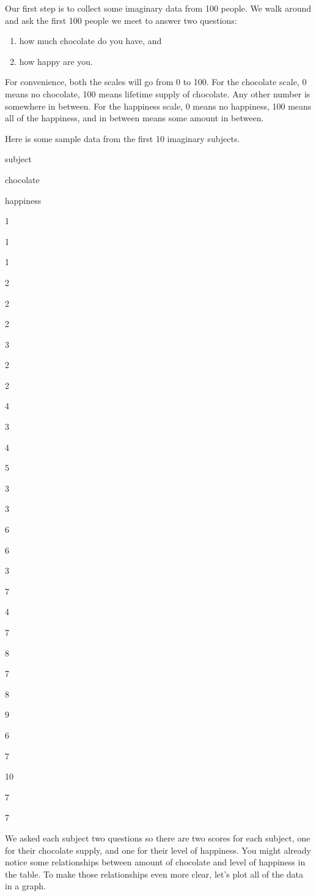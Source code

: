\documentclass[]{book}
\providecommand{\tightlist}{%
  \setlength{\itemsep}{0pt}\setlength{\parskip}{0pt}}
\begin{document}
Our first step is to collect some imaginary data from 100 people. We walk around and ask the first 100 people we meet to answer two questions:

\begin{enumerate}
\def\labelenumi{\arabic{enumi}.}
\tightlist
\item
  how much chocolate do you have, and
\item
  how happy are you.
\end{enumerate}

For convenience, both the scales will go from 0 to 100. For the chocolate scale, 0 means no chocolate, 100 means lifetime supply of chocolate. Any other number is somewhere in between. For the happiness scale, 0 means no happiness, 100 means all of the happiness, and in between means some amount in between.

Here is some sample data from the first 10 imaginary subjects.

subject

chocolate

happiness

1

1

1

2

2

2

3

2

2

4

3

4

5

3

3

6

6

3

7

4

7

8

7

8

9

6

7

10

7

7

We asked each subject two questions so there are two scores for each subject, one for their chocolate supply, and one for their level of happiness. You might already notice some relationships between amount of chocolate and level of happiness in the table. To make those relationships even more clear, let's plot all of the data in a graph.
\end{document}
